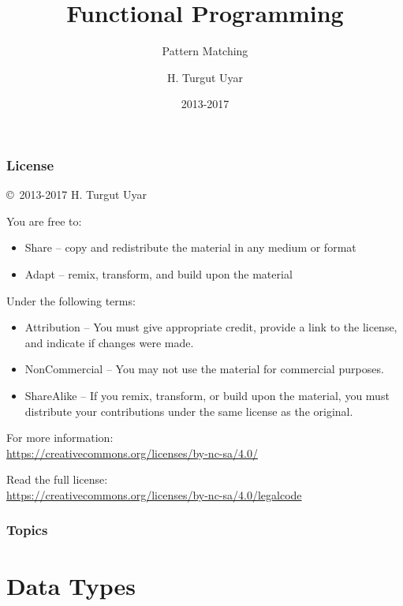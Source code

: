 \documentclass[dvipsnames]{beamer}
\title{Functional Programming}
\subtitle{Pattern Matching}
\author{H. Turgut Uyar}
\date{2013-2017}
\theoremstyle{plain}
\begin{document}
\begin{frame}
  \titlepage
\end{frame}

\begin{frame}
  \frametitle{License}

  \hfill
  \copyright~2013-2017 H. Turgut Uyar

  \vfill
  \begin{footnotesize}
    You are free to:
    \begin{itemize}
      \itemsep0em
      \item Share -- copy and redistribute the material in any medium or format
      \item Adapt -- remix, transform, and build upon the material
    \end{itemize}

    Under the following terms:
    \begin{itemize}
      \itemsep0em
      \item Attribution -- You must give appropriate credit, provide a link to
        the license, and indicate if changes were made.

      \item NonCommercial -- You may not use the material for commercial
        purposes.

      \item ShareAlike -- If you remix, transform, or build upon the material,
        you must distribute your contributions under the same license as the
        original.
    \end{itemize}

    For more information:\\
    \url{https://creativecommons.org/licenses/by-nc-sa/4.0/}

    \smallskip
    Read the full license:\\
    \url{https://creativecommons.org/licenses/by-nc-sa/4.0/legalcode}
  \end{footnotesize}
\end{frame}

\begin{frame}
  \frametitle{Topics}
  \tableofcontents
\end{frame}


\section{Data Types}
\end{document}
